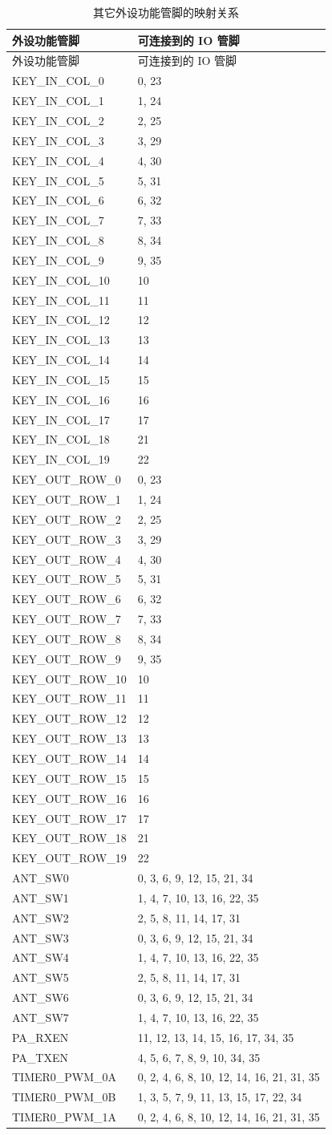 \documentclass[
  12pt,
]{book}
\begin{document}
\begin{longtable}[]{@{}ll@{}}
\caption{\label{tab:ch-pinctrl-mapping} 其它外设功能管脚的映射关系}\tabularnewline
\toprule
外设功能管脚 & 可连接到的 IO 管脚\tabularnewline
\midrule
\endfirsthead
\toprule
外设功能管脚 & 可连接到的 IO 管脚\tabularnewline
\midrule
\endhead
KEY\_IN\_COL\_0 & 0, 23\tabularnewline
KEY\_IN\_COL\_1 & 1, 24\tabularnewline
KEY\_IN\_COL\_2 & 2, 25\tabularnewline
KEY\_IN\_COL\_3 & 3, 29\tabularnewline
KEY\_IN\_COL\_4 & 4, 30\tabularnewline
KEY\_IN\_COL\_5 & 5, 31\tabularnewline
KEY\_IN\_COL\_6 & 6, 32\tabularnewline
KEY\_IN\_COL\_7 & 7, 33\tabularnewline
KEY\_IN\_COL\_8 & 8, 34\tabularnewline
KEY\_IN\_COL\_9 & 9, 35\tabularnewline
KEY\_IN\_COL\_10 & 10\tabularnewline
KEY\_IN\_COL\_11 & 11\tabularnewline
KEY\_IN\_COL\_12 & 12\tabularnewline
KEY\_IN\_COL\_13 & 13\tabularnewline
KEY\_IN\_COL\_14 & 14\tabularnewline
KEY\_IN\_COL\_15 & 15\tabularnewline
KEY\_IN\_COL\_16 & 16\tabularnewline
KEY\_IN\_COL\_17 & 17\tabularnewline
KEY\_IN\_COL\_18 & 21\tabularnewline
KEY\_IN\_COL\_19 & 22\tabularnewline
KEY\_OUT\_ROW\_0 & 0, 23\tabularnewline
KEY\_OUT\_ROW\_1 & 1, 24\tabularnewline
KEY\_OUT\_ROW\_2 & 2, 25\tabularnewline
KEY\_OUT\_ROW\_3 & 3, 29\tabularnewline
KEY\_OUT\_ROW\_4 & 4, 30\tabularnewline
KEY\_OUT\_ROW\_5 & 5, 31\tabularnewline
KEY\_OUT\_ROW\_6 & 6, 32\tabularnewline
KEY\_OUT\_ROW\_7 & 7, 33\tabularnewline
KEY\_OUT\_ROW\_8 & 8, 34\tabularnewline
KEY\_OUT\_ROW\_9 & 9, 35\tabularnewline
KEY\_OUT\_ROW\_10 & 10\tabularnewline
KEY\_OUT\_ROW\_11 & 11\tabularnewline
KEY\_OUT\_ROW\_12 & 12\tabularnewline
KEY\_OUT\_ROW\_13 & 13\tabularnewline
KEY\_OUT\_ROW\_14 & 14\tabularnewline
KEY\_OUT\_ROW\_15 & 15\tabularnewline
KEY\_OUT\_ROW\_16 & 16\tabularnewline
KEY\_OUT\_ROW\_17 & 17\tabularnewline
KEY\_OUT\_ROW\_18 & 21\tabularnewline
KEY\_OUT\_ROW\_19 & 22\tabularnewline
ANT\_SW0 & 0, 3, 6, 9, 12, 15, 21, 34\tabularnewline
ANT\_SW1 & 1, 4, 7, 10, 13, 16, 22, 35\tabularnewline
ANT\_SW2 & 2, 5, 8, 11, 14, 17, 31\tabularnewline
ANT\_SW3 & 0, 3, 6, 9, 12, 15, 21, 34\tabularnewline
ANT\_SW4 & 1, 4, 7, 10, 13, 16, 22, 35\tabularnewline
ANT\_SW5 & 2, 5, 8, 11, 14, 17, 31\tabularnewline
ANT\_SW6 & 0, 3, 6, 9, 12, 15, 21, 34\tabularnewline
ANT\_SW7 & 1, 4, 7, 10, 13, 16, 22, 35\tabularnewline
PA\_RXEN & 11, 12, 13, 14, 15, 16, 17, 34, 35\tabularnewline
PA\_TXEN & 4, 5, 6, 7, 8, 9, 10, 34, 35\tabularnewline
TIMER0\_PWM\_0A & 0, 2, 4, 6, 8, 10, 12, 14, 16, 21, 31, 35\tabularnewline
TIMER0\_PWM\_0B & 1, 3, 5, 7, 9, 11, 13, 15, 17, 22, 34\tabularnewline
TIMER0\_PWM\_1A & 0, 2, 4, 6, 8, 10, 12, 14, 16, 21, 31, 35\tabularnewline

\end{longtable}
\end{document}
